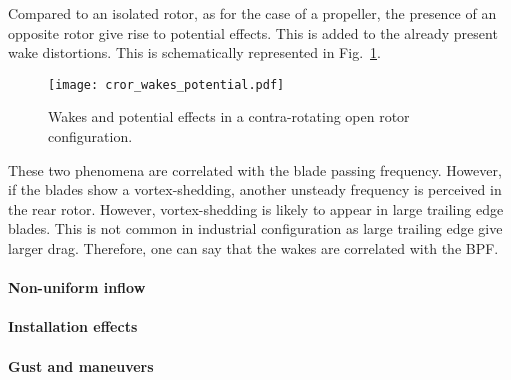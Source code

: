 Compared to an isolated rotor, as for the case of a propeller,
the presence of an opposite rotor give rise to potential effects.
This is added to the already present wake distortions. This is
schematically represented in Fig.~\ref{fig:cror_wakes_potential}.
\begin{figure}[htb]
  \centering
  \texttt{[image: cror\_wakes\_potential.pdf]}
  \caption{Wakes and potential effects in a 
  contra-rotating open rotor configuration.}
  \label{fig:cror_wakes_potential}
\end{figure}
These two phenomena are correlated with the blade passing frequency.
However, if the blades show a vortex-shedding, another
unsteady frequency is perceived in the rear rotor. However,
vortex-shedding is likely to appear in large trailing edge blades.
This is not common in industrial configuration as large trailing edge
give larger drag. Therefore, one can say that the wakes are
correlated with the BPF.

\paragraph{Non-uniform inflow}

\paragraph{Installation effects}

\paragraph{Gust and maneuvers}
